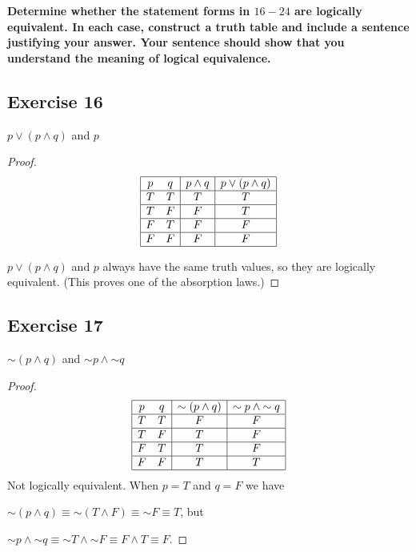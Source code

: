 \documentclass[14pt]{extarticle}
\begin{document}
{\bf Determine whether the statement forms in $16-24$ are logically equivalent. In each case, construct a truth table and include a sentence justifying your answer. Your sentence should show that you understand the meaning of logical equivalence.}

\subsection{Exercise 16} 
$p \vee (p \wedge q)$ and $p$

\begin{proof} 
$$ 
\begin{array}{|cc|c|c|} 
\hline 
p & q & p \wedge q & p \vee (p \wedge q) \\ 
\hline 
T & T & T & T \\ 
\hline 
T & F & F & T \\ 
\hline 
F & T & F & F \\ 
\hline 
F & F & F & F \\ 
\hline 
\end{array} 
$$

$p \vee (p \wedge q)$ and $p$ always have the same truth values, so they are logically equivalent. (This proves one of the absorption laws.) 
\end{proof}

\subsection{Exercise 17} 
${\sim(p \wedge q)}$ and ${\sim p} \wedge {\sim q}$

\begin{proof} 
$$ 
\begin{array}{|cc|c|c|} 
\hline 
p & q & {\sim(p \wedge q)} & {\sim p} \wedge {\sim q} \\ 
\hline 
T & T & F & F \\ 
\hline 
T & F & T & F \\
\hline 
F & T & T & F \\ 
\hline 
F & F & T & T \\ 
\hline 
\end{array} 
$$ 
Not logically equivalent. When $p = T$ and $q = F$ we have

${\sim (p \wedge q)} \equiv {\sim (T \wedge F)} \equiv {\sim F} \equiv T$, but

${\sim p} \wedge {\sim q} \equiv {\sim T \wedge {\sim F}} \equiv F \wedge T \equiv F$. 
\end{proof}
\end{document}
